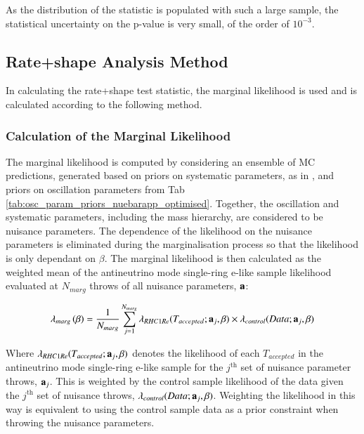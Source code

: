 As the distribution of the statistic is populated with such a large sample, the statistical uncertainty on the p-value is very small, of the order of $10^{-3}$.





\subsection{Rate+shape Analysis Method}
\label{sec:method_rate+shape}

{\color{red}
In calculating the rate+shape test statistic, the marginal likelihood is used and is calculated according to the following method.


\subsubsection{Calculation of the Marginal Likelihood} \label{sec:marg}

The marginal likelihood is computed by considering an ensemble of MC predictions, generated based on priors on systematic parameters, as in \cite{OurRun18CC1piJointAnalysis3Flavour}, and priors on oscillation parameters from Tab \ref{tab:osc_param_priors_nuebarapp_optimised}. Together, the oscillation and systematic parameters, including the mass hierarchy, are considered to be nuisance parameters. The dependence of the likelihood on the nuisance parameters is eliminated during the marginalisation process so that the likelihood is only dependant on $\beta$. The marginal likelihood is then calculated as the weighted mean of the antineutrino mode single-ring e-like sample likelihood evaluated at $N_{marg}$ throws of all nuisance parameters, ${\bf a}$:

\begin{equation} \label{eq:marginal_likelihood}
\lambda_{marg} \left( \beta \right) = \frac{1}{N_{marg}} \sum_{j=1}^{N_{marg}} 
\lambda_{RHC1Re} (T_{accepted}; {\bf a}_{j},\beta) \times
\lambda_{control}(Data; {\bf a}_{j},\beta)
\end{equation}

Where $\lambda_{RHC1Re}(T_{accepted}; {\bf a}_{j},\beta)$ denotes the likelihood of each $T_{accepted}$ in the antineutrino mode single-ring e-like sample for the $j^{\text{th}}$ set of nuisance parameter throws, ${\bf a}_{j}$. This is weighted by the control sample likelihood of the data given the $j^{\text{th}}$ set of nuisance throws, $\lambda_{control}(Data; {\bf a}_{j},\beta)$. Weighting the likelihood in this way is equivalent to using the control sample data as a prior constraint when throwing the nuisance parameters.

}
